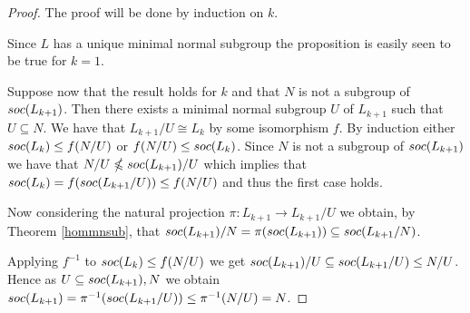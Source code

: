\begin{proof}
    The proof will be done by induction on $k$.

    Since $L$ has a unique minimal normal subgroup the proposition is easily seen to be true for $k=1$.
    
    Suppose now that the result holds for $k$ and that $N$ is not a subgroup of $soc {(L_{k+1})}$. Then there exists a minimal normal subgroup $U$ of $L_{k+1}$ such that $U \subseteq N$.
    We have that $L_{k+1}/U \cong L_{k}$ by some isomorphism $f$.
    By induction either $soc {(L_{k})} \le f(N/U)$ or $f(N/U) \le soc {(L_k)}$. Since $N$ is not a subgroup of $soc {(L_{k+1})}$ we have that $N/U \nleqslant soc {(L_{k+1})}/U$ which implies that $soc {(L_k)} = f(soc {(L_{k+1}/U)}) \le f(N/U)$ and thus the first case holds.
    
    Now considering the natural projection $\pi \colon L_{k+1} \longrightarrow L_{k+1}/U$  we obtain, by Theorem \ref{hommnsub}, that $soc {(L_{k+1})}/N = \pi(soc {(L_{k+1})}) \subseteq soc {(L_{k+1} / N)}$.
    
    
    Applying $f^{-1}$ to $soc {(L_k)} \le f(N/U)$ we get $soc {(L_{k+1})}/U \subseteq soc {(L_{k+1}/U)} \le N/U$. Hence as $U \subseteq soc {(L_{k+1})}, N$ we obtain $soc {(L_{k+1})} = \pi^{-1}(soc {(L_{k+1}/U)}) \le \pi^{-1}(N/U) = N$.
\end{proof}